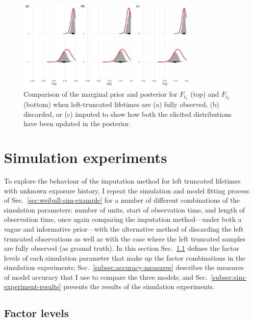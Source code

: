 \begin{figure}
    \centering
    \includegraphics[width=0.8\textwidth]{./figures/ch-2/prior-post-comp.pdf}
    \caption{Comparison of the marginal prior and posterior for $F_{t_1}$ (top) and $F_{t_2}$ (bottom) when left-truncated lifetimes are (a) fully observed, (b) discarded, or (c) imputed to show how both the elicited distributions have been updated in the posterior.}
    \label{fig:weibull-prior-post-comp}
\end{figure}

\section{Simulation experiments} \label{sec:weibull-sim-study}

To explore the behaviour of the imputation method for left truncated lifetimes with unknown exposure history, I repeat the simulation and model fitting process of Sec.~\ref{sec:weibull-sim-example} for a number of different combinations of the simulation parameters: number of units, start of observation time, and length of observation time, once again comparing the imputation method---under both a vague and informative prior---with the alternative method of discarding the left truncated observations as well as with the case where the left truncated samples are fully observed (as ground truth). 
In this section Sec.~\ref{subsec:factor-lvls} defines the factor levels of each simulation parameter that make up the factor combinations in the simulation experiments; Sec.~\ref{subsec:accuracy-measures} describes the measures of model accuracy that I use to compare the three models; and Sec.~\ref{subsec:sim-experiment-results} presents the results of the simulation experiments.

\subsection{Factor levels} \label{subsec:factor-lvls}

